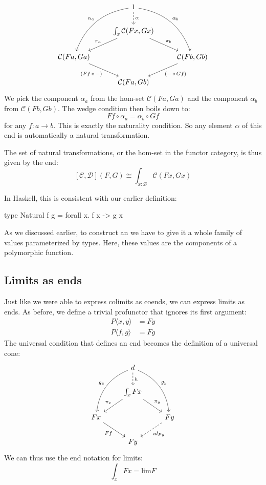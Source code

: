 \documentclass[DaoFP]{subfiles}
\begin{document}
\[
 \begin{tikzcd}
 & 1
 \arrow[d, dashed, "\alpha"]
\arrow[ddl, bend right, "\alpha_a"']
 \arrow[ddr, bend left, "\alpha_b"]
 \\
 & \int_{x} \mathcal{C}(F x, G x)
 \arrow[ld, "\pi_a"']
 \arrow[rd, "\pi_b"]
 \\
  \mathcal{C} ( F a, G a )
 \arrow[dr, "{(F f \, \circ \, -)}"']
 && \mathcal{C} ( F b, G b )
 \arrow[dl, "{(- \, \circ\, G f)}"]
 \\
 &  \mathcal{C} ( F a, G b )
 \end{tikzcd}
\]
We pick the component $\alpha_a$ from the hom-set $\mathcal{C} ( F a, G a )$ and the component $\alpha_b$ from $\mathcal{C} ( F b, G b )$. The wedge condition then boils down to:
\[ F f \circ \alpha_a = \alpha_b \circ G f \]
for any $f \colon a \to b$. This is exactly the naturality condition. So any element $\alpha$ of this end is automatically a natural transformation.

The set of natural transformations, or the hom-set in the functor category, is thus given by the end:
\[ [\mathcal{C}, \mathcal{D}] (F, G) \cong \int_{x \colon  \mathcal{B}} \mathcal{C}(F x, G x)\]

In Haskell, this is consistent with our earlier definition:
\begin{haskell}
type Natural f g = forall x. f x -> g x
\end{haskell}

As we discussed earlier, to construct an  we have to give it a whole family of values parameterized by types. Here, these values are the components of a polymorphic function. 

\subsection{Limits as ends}
Just like we were able to express colimits as coends, we can express limits as ends. As before, we define a trivial profunctor that ignores its first argument:
\begin{align*}
 P \langle x, y \rangle &= F y \\
 P \langle f, g \rangle &= F g 
\end{align*}
The universal condition that defines an end becomes the definition of a universal cone:
\[
 \begin{tikzcd}
 &d
 \arrow[ddl, bend right, "g_x"']
 \arrow[ddr, bend left, "g_y"]
 \arrow[d, dashed, "h"]
 \\
 & \int_x F x
 \arrow[ld, "\pi_x"']
 \arrow[rd, "\pi_y"]
 \\
 F x
 \arrow[dr, "F f"']
 &&F y
 \arrow[dl, dashed, "id_{F y}"]
 \\
 & F y
 \end{tikzcd}
\]
We can thus use the end notation for limits:
\[ \int_x F x = \text{lim} F \]
\end{document}
